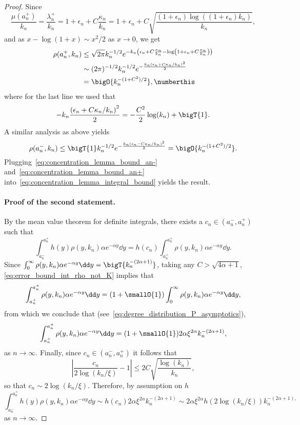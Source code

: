 \begin{proof}
Since 
\[
	\frac{\mu(a_n^+)}{k_n} = \frac{\lambda_n^{+}}{k_n} = 1 + \epsilon_n + C \frac{\kappa_n}{k_n} 
	= 1 + \epsilon_n + C \sqrt{\frac{(1+\epsilon_n)\log((1+\epsilon_n)k_n)}{k_n}},
\]
and as $x - \log(1 + x) \sim x^2/2$ as $x \to 0$, we get 
\begin{align*}
	\rho(a_n^+,k_n) 
	&\le \sqrt{2\pi} k_n^{-1/2} 
		e^{-k_n\left(\epsilon_n + C \frac{\kappa_n}{k_n} - \log\left(1 + \epsilon_n + C \frac{\kappa_n}{k_n}\right)\right)}\\
	&\sim (2\pi)^{-1/2} k_n^{-1/2} e^{-\frac{k_n \left(\epsilon_n + C \kappa_n/k_n\right)^2}{2}} \\
	&= \bigO{k_n^{-(1+C^2)/2}},		\numberthis \label{eq:concentration_lemma_bound_an+}
\end{align*}
where for the last line we used that
\[
	-k_n \frac{\left(\epsilon_n + C \kappa_n/k_n\right)^2}{2} = -\frac{C^2}{2}\log(k_n) + \bigT{1}.
\]
A similar analysis as above yields
\begin{equation}\label{eq:concentration_lemma_bound_an-}
	\rho(a_n^-,k_n) \le \bigT{1} k_n^{-1/2} e^{-\frac{k_n \left(\epsilon_n - C \kappa_n/k_n\right)^2}{2}} = \bigO{k_n^{-(1+C^2)/2}}.
\end{equation} 
Plugging~\eqref{eq:concentration_lemma_bound_an-} and~\eqref{eq:concentration_lemma_bound_an+}  into~\eqref{eq:concentration_lemma_integral_bound} yields the result. 

\paragraph{Proof of the second statement.} By the mean value theorem for definite integrals, there exists a $c_n \in (a_n^-, a_n^+)$ such that
\[
	\int_{a_n^-}^{a_n^+} h(y) \rho(y,k_n) \alpha e^{-\alpha y} \dd y
	= h(c_n) \int_{a_n^+}^{a_n^+} \rho(y,k_n) \alpha e^{-\alpha y} \dd y.
\]
Since $\int_0^\infty \rho(y,k_n) \alpha e^{-\alpha y} \dd y = \bigT{k_n^{-(2\alpha + 1)}}$, taking any $C > \sqrt{4\alpha + 1}$, \eqref{eq:error_bound_int_rho_not_K} implies that
\[
	\int_{a_n^+}^{a_n^+} \rho(y,k_n) \alpha e^{-\alpha y} \dd y
	= (1 + \smallO{1})\int_0^\infty \rho(y,k_n) \alpha e^{-\alpha y} \dd y,
\]
from which we conclude that (see~\eqref{eq:degree_distribution_P_asymptotics}),
\[
	\int_{a_n^+}^{a_n^+} \rho(y,k_n) \alpha e^{-\alpha y} \dd y = (1 + \smallO{1}) 2\alpha \xi^{2\alpha} k_n^{-(2\alpha + 1)},
\]
as $n \to \infty$. Finally, since $c_n \in (a_n^-, a_n^+)$ it follows that
\[
	\left|\frac{c_n}{2\log(k_n/\xi)} - 1\right| \le 2 C \sqrt{\frac{\log(k_n)}{k_n}}, 
\]
so that $c_n \sim 2\log(k_n/\xi)$. Therefore, by assumption on $h$ 
\[
	\int_{a_n^-}^{a_n^+} h(y) \rho(y,k_n) \alpha e^{-\alpha y} \dd y
	\sim h(c_n) 2\alpha \xi^{2\alpha} k_n^{-(2\alpha + 1)} 
	\sim 2\alpha \xi^{2\alpha} h(2\log(k_n/\xi)) k_n^{-(2\alpha + 1),}
\]
as $n \to \infty$.
\end{proof}

